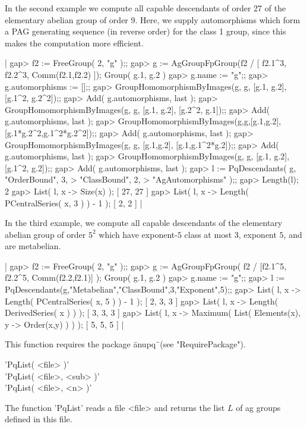 In the second example we compute all  capable descendants of order  27 of
the  elementary abelian group of order 9.  Here, we supply  automorphisms
which form a  PAG generating  sequence (in reverse order) for the class 1
group, since this  makes the computation more efficient.

|    gap> f2 := FreeGroup( 2, "g" );;
    gap> g := AgGroupFpGroup(f2 / [ f2.1^3, f2.2^3, Comm(f2.1,f2.2) ]);
    Group( g.1, g.2 )
    gap> g.name := "g";;
    gap> g.automorphisms := [];;
    gap> GroupHomomorphismByImages(g, g, [g.1, g.2], [g.1^2, g.2^2]);;
    gap> Add( g.automorphisms, last );
    gap> GroupHomomorphismByImages(g, g, [g.1, g.2], [g.2^2, g.1]);;
    gap> Add( g.automorphisms, last );
    gap> GroupHomomorphismByImages(g,g,[g.1,g.2],[g.1*g.2^2,g.1^2*g.2^2]);;
    gap> Add( g.automorphisms, last );
    gap> GroupHomomorphismByImages(g, g, [g.1,g.2], [g.1,g.1^2*g.2]);;
    gap> Add( g.automorphisms, last );
    gap> GroupHomomorphismByImages(g, g, [g.1, g.2], [g.1^2, g.2]);;
    gap> Add( g.automorphisms, last );
    gap> l := PqDescendants( g, "OrderBound", 3,
    >                           "ClassBound", 2,
    >                           "AgAutomorphisms" );;
    gap> Length(l);
    2
    gap> List( l, x -> Size(x) );
    [ 27, 27 ]
    gap> List( l, x -> Length( PCentralSeries( x, 3 ) ) - 1 );
    [ 2, 2 ] |

In  the  third  example,  we  compute  all  capable  descendants  of  the
elementary abelian group of order  $5^2$ which have exponent-$5$ class at
most $3$, exponent $5$, and are metabelian.

|    gap> f2 := FreeGroup( 2, "g" );;
    gap> g := AgGroupFpGroup( f2 / [f2.1^5, f2.2^5, Comm(f2.2,f2.1)] );
    Group( g.1, g.2 )
    gap> g.name := "g";;
    gap> l := PqDescendants(g,"Metabelian","ClassBound",3,"Exponent",5);;
    gap> List( l, x -> Length( PCentralSeries( x, 5 ) ) - 1 );
    [ 2, 3, 3 ]
    gap> List( l, x -> Length( DerivedSeries( x ) ) );
    [ 3, 3, 3 ]
    gap> List( l, x -> Maximum( List( Elements(x), y -> Order(x,y) ) ) );
    [ 5, 5, 5 ] |

This function requires the package \"anupq\"\ (see "RequirePackage").


'PqList( <file> )' \\
'PqList( <file>, <sub> )' \\
'PqList( <file>, <n> )'

The function 'PqList' reads a file  <file> and returns the list $L$ of ag
groups defined in this file.

